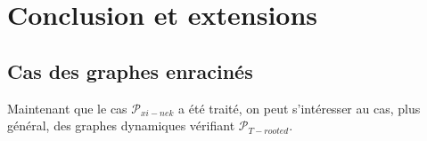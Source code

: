 \documentclass{article}
\begin{document}
\section{Conclusion et extensions}

\subsection{Cas des graphes enracinés}

Maintenant que le cas $\mathcal{P}_{xi-nek}$ a été traité, on peut s'intéresser au cas, plus général, des graphes dynamiques vérifiant $\mathcal{P}_{T-rooted}$.



\printbibliography
\end{document}
